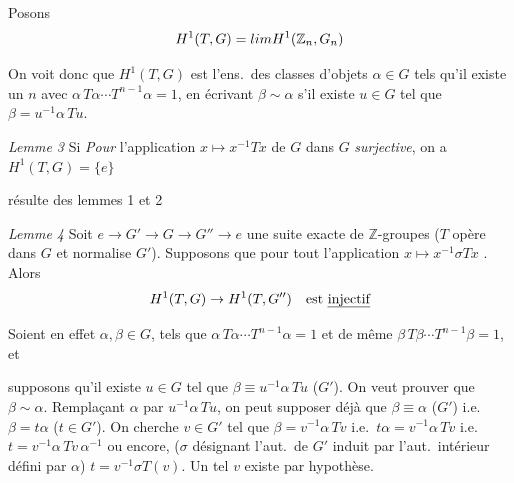 \documentclass[11pt,a4paper]{article}
\begin{document}
Posons
\[
  H^1(T, G) = \varinjlim H^1(\mathbb{Z}_n, G_n)
\]

On voit donc que $H^1(T, G)$ est l'ens.\ des classes d'objets $\alpha \in G$
tels qu'il existe un $n$ avec $\alpha\,T\alpha \cdots T^{n-1}\alpha = 1$,
 en écrivant $\beta \sim \alpha$ s'il existe $u \in G$ tel que
$\beta = u^{-1}\alpha\,Tu$.

\emph{Lemme 3} \quad Si \emph{Pour} \struck{\ill{}} l'application
$x \mapsto x^{-1}Tx$ de $G$ dans $G$ \emph{surjective}, on a
$H^1(T, G) = \lbrace e \rbrace$

\quad résulte des lemmes 1 et 2

\emph{Lemme 4} \quad Soit $e \to G' \to G \to G'' \to e$ une suite exacte de
$\mathbb{Z}$-groupes ($T$ opère dans $G$ et normalise $G'$). Supposons que
pour tout 
l'application \struck{\ill{} \ill{} \ill{} \ill{} \ill{}}
$x \mapsto x^{-1}\sigma Tx$ 
.
Alors
\[
  H^1(T, G) \to H^1(T, G'') \quad \text{est \emph{injectif}}
\]

Soient en effet $\alpha, \beta \in G$, tels que $\alpha\,T\alpha \cdots
T^{n-1}\alpha = 1$ et de même $\beta\,T\beta \cdots T^{n-1}\beta = 1$, et


supposons qu'il existe $u \in G$ tel que $\beta \equiv u^{-1}\alpha\,Tu$
($G'$). On veut prouver que $\beta \sim \alpha$. Remplaçant $\alpha$ par
$u^{-1}\alpha\,Tu$, on peut supposer déjà que $\beta \equiv \alpha$ ($G'$)
i.e.\ $\beta = t\alpha$ ($t \in G'$). On cherche $v \in G'$ tel que
$\beta = v^{-1}\alpha\,Tv$ i.e.\ $t\alpha = v^{-1}\alpha\,Tv$ i.e.\
$t = v^{-1}\alpha\,Tv\,\alpha^{-1}$ ou encore, ($\sigma$ désignant l'aut.\
de $G'$ induit par l'aut.\ intérieur défini par $\alpha$)
$t = v^{-1}\sigma T(v)$. Un tel $v$ existe par hypothèse.
\end{document}
